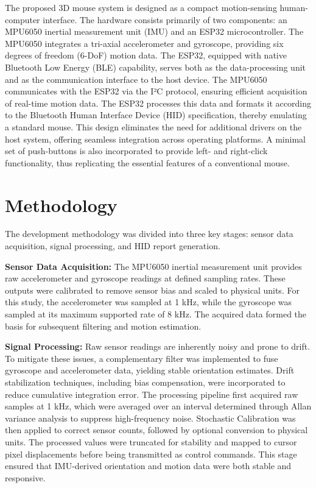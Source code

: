 \documentclass[10pt]{article}
\begin{document}
The proposed 3D mouse system is designed as a compact motion-sensing human-computer interface. The hardware consists primarily of two components: an MPU6050 inertial measurement unit (IMU) and an ESP32 microcontroller. The MPU6050 integrates a tri-axial accelerometer and gyroscope, providing six degrees of freedom (6-DoF) motion data. The ESP32, equipped with native Bluetooth Low Energy (BLE) capability, serves both as the data-processing unit and as the communication interface to the host device. The MPU6050 communicates with the ESP32 via the I²C protocol, ensuring efficient acquisition of real-time motion data. The ESP32 processes this data and formats it according to the Bluetooth Human Interface Device (HID) specification, thereby emulating a standard mouse. This design eliminates the need for additional drivers on the host system, offering seamless integration across operating platforms. A minimal set of push-buttons is also incorporated to provide left- and right-click functionality, thus replicating the essential features of a conventional mouse.



\section*{Methodology}

The development methodology was divided into three key stages: sensor data acquisition, signal processing, and HID report generation.

\textbf{Sensor Data Acquisition:}
The MPU6050 inertial measurement unit provides raw accelerometer and gyroscope 
readings at defined sampling rates. These outputs were calibrated to remove 
sensor bias and scaled to physical units. For this study, the accelerometer was 
sampled at 1 kHz, while the gyroscope was sampled at its maximum supported rate 
of 8 kHz. The acquired data formed the basis for subsequent filtering and motion 
estimation.

\textbf{Signal Processing:}
Raw sensor readings are inherently noisy and prone to drift. To mitigate these 
issues, a complementary filter was implemented to fuse gyroscope and accelerometer 
data, yielding stable orientation estimates. Drift stabilization techniques, 
including bias compensation, were incorporated to reduce cumulative integration 
error. The processing pipeline first acquired raw samples at 1 kHz, which were 
averaged over an interval determined through Allan variance analysis to suppress 
high-frequency noise. Stochastic Calibration was then applied to correct sensor 
counts, followed by optional conversion to physical units. The processed values 
were truncated for stability and mapped to cursor pixel displacements before 
being transmitted as control commands. This stage ensured that IMU-derived 
orientation and motion data were both stable and responsive.
\end{document}
